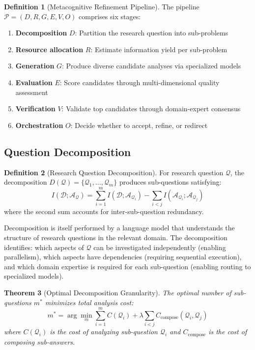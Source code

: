 \documentclass[10pt,twocolumn]{article}
\newtheorem{theorem}{Theorem}[section]
\theoremstyle{definition}
\newtheorem{definition}[theorem]{Definition}
\theoremstyle{remark}
\newcommand{\question}{\mathcal{Q}}
\newcommand{\answer}{\mathcal{A}}
\newcommand{\dataset}{\mathcal{D}}
\newcommand{\pipeline}{\mathcal{P}}
\begin{document}
\begin{definition}[Metacognitive Refinement Pipeline]
\label{def:pipeline}
The pipeline $\pipeline = (D, R, G, E, V, O)$ comprises six stages:
\begin{enumerate}[nosep]
\item \textbf{Decomposition} $D$: Partition the research question into sub-problems
\item \textbf{Resource allocation} $R$: Estimate information yield per sub-problem
\item \textbf{Generation} $G$: Produce diverse candidate analyses via specialized models
\item \textbf{Evaluation} $E$: Score candidates through multi-dimensional quality assessment
\item \textbf{Verification} $V$: Validate top candidates through domain-expert consensus
\item \textbf{Orchestration} $O$: Decide whether to accept, refine, or redirect
\end{enumerate}
\end{definition}

\subsection{Question Decomposition}

\begin{definition}[Research Question Decomposition]
For research question $\question$, the decomposition $D(\question) = \{\question_1, \ldots, \question_m\}$ produces sub-questions satisfying:
\begin{equation}
I(\dataset; \answer_\question) = \sum_{i=1}^{m} I(\dataset; \answer_{\question_i}) - \sum_{i < j} I(\answer_{\question_i}; \answer_{\question_j})
\end{equation}
where the second sum accounts for inter-sub-question redundancy.
\end{definition}

Decomposition is itself performed by a language model that understands the structure of research questions in the relevant domain. The decomposition identifies: which aspects of $\question$ can be investigated independently (enabling parallelism), which aspects have dependencies (requiring sequential execution), and which domain expertise is required for each sub-question (enabling routing to specialized models).

\begin{theorem}[Optimal Decomposition Granularity]
\label{thm:decomposition_granularity}
The optimal number of sub-questions $m^*$ minimizes total analysis cost:
\begin{equation}
m^* = \arg\min_m \sum_{i=1}^{m} C(\question_i) + \lambda \sum_{i < j} C_{\text{compose}}(\question_i, \question_j)
\end{equation}
where $C(\question_i)$ is the cost of analyzing sub-question $\question_i$ and $C_{\text{compose}}$ is the cost of composing sub-answers.
\end{theorem}
\end{document}
